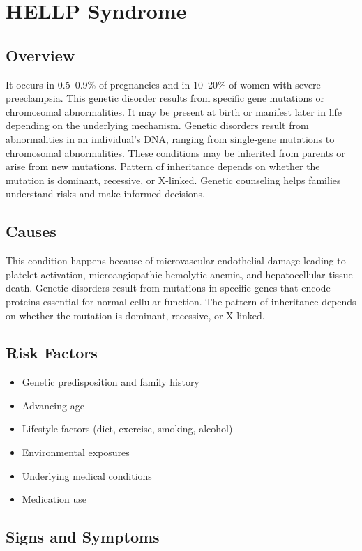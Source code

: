 \chapter{HELLP Syndrome}
\label{sec:HELLP Syndrome}

\section{Overview}
It occurs in 0.5--0.9\% of pregnancies and in 10--20\% of women with severe preeclampsia. This genetic disorder results from specific gene mutations or chromosomal abnormalities. It may be present at birth or manifest later in life depending on the underlying mechanism. Genetic disorders result from abnormalities in an individual's DNA, ranging from single-gene mutations to chromosomal abnormalities. These conditions may be inherited from parents or arise from new mutations. Pattern of inheritance depends on whether the mutation is dominant, recessive, or X-linked. Genetic counseling helps families understand risks and make informed decisions.
\section{Causes}
This condition happens because of microvascular endothelial damage leading to platelet activation, microangiopathic hemolytic anemia, and hepatocellular tissue death. Genetic disorders result from mutations in specific genes that encode proteins essential for normal cellular function. The pattern of inheritance depends on whether the mutation is dominant, recessive, or X-linked.   
\section{Risk Factors}

\begin{itemize}[noitemsep]
  \item Genetic predisposition and family history
  \item Advancing age
  \item Lifestyle factors (diet, exercise, smoking, alcohol)
  \item Environmental exposures
  \item Underlying medical conditions
  \item Medication use
\end{itemize}
\section{Signs and Symptoms}

